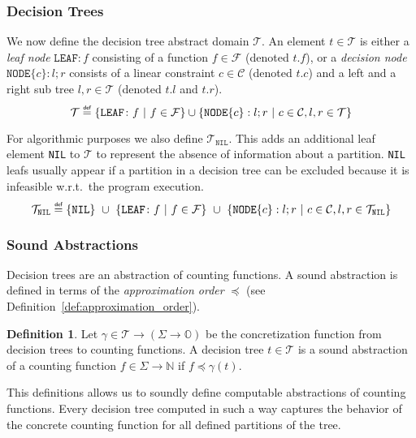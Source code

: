\documentclass[11pt,a4paper,titlepage]{article}
\theoremstyle{definition}
\newtheorem{definition}{Definition}[section]
\newcommand\eqdef{\mathrel{\overset{\makebox[0pt]{\mbox{\normalfont\tiny\sffamily def}}}{=}}}
\begin{document}
\subsubsection*{Decision Trees}

We now define the decision tree abstract domain $\mathcal{T}$.
An element $t \in \mathcal{T}$ is either a \textit{leaf node} $\mathtt{LEAF} \colon f$ consisting of a function $f \in \mathcal{F}$ (denoted $t.f$),
or a \textit{decision node} $\mathtt{NODE}\{c\}: l; r$ consists of a linear constraint $c \in \mathcal{C}$ (denoted $t.c$) 
and a left and a right sub tree $l, r \in \mathcal{T}$ 
(denoted $t.l$ and $t.r$).
\[
    \mathcal{T} \eqdef \{\mathtt{LEAF} \colon f \ | \ f \in \mathcal{F}\} \cup \{\mathtt{NODE}\{c\}: l; r \ | \ c \in \mathcal{C}, l, r \in \mathcal{T} \} 
\]

For algorithmic purposes we also define $\mathcal{T}_{\mathtt{NIL}}$. 
This adds an additional leaf element \texttt{NIL} to $\mathcal{T}$ to represent the absence of information about a partition.
\texttt{NIL} leafs usually appear if a partition in a decision tree can be excluded because it is infeasible w.r.t.\ the program execution.
\[
    \mathcal{T}_{\mathtt{NIL}} \eqdef \{\mathtt{NIL}\} \ \cup \ \{\mathtt{LEAF} \colon f \ | 
    \ f \in \mathcal{F}\} \ \cup \ \{\mathtt{NODE}\{c\}: l; r \ | \ c \in \mathcal{C}, l, r \in \mathcal{T}_{\mathtt{NIL}}  \} 
\]


\subsubsection*{Sound Abstractions}

Decision trees are an abstraction of counting functions.  
A sound abstraction is defined in terms of the \textit{approximation order} $\preceq$ (see Definition~\ref{def:approximation_order}).\\

\begin{definition}\label{def:sound_abstraction}
    Let $\gamma \in \mathcal{T} \rightarrow (\Sigma \rightarrow \mathbb{O}) $ be the concretization function from decision trees to counting functions.
    A decision tree $t \in \mathcal{T}$ is a sound abstraction of a counting function $f \in \Sigma \rightarrow \mathbb{N}$ if $f \preceq \gamma(t)$.\\
\end{definition}

This definitions allows us to soundly define computable abstractions of counting functions. 
Every decision tree computed in such a way captures the behavior of the concrete counting function for 
all defined partitions of the tree.
\end{document}
